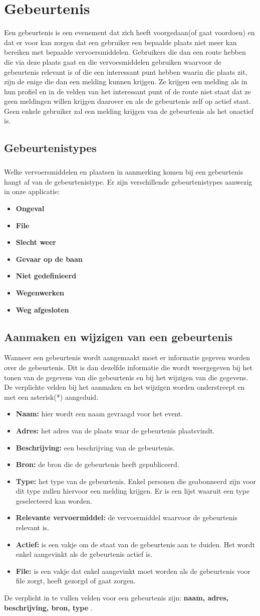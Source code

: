 \documentclass{scrbook}
\newcommand*{\veld}[1]{
	\item \textbf{#1} 
}
\newcommand*{\verplicht}[1]{
	\textbf{#1}
}
\begin{document}
\chapter{Gebeurtenis}
Een gebeurtenis is een evenement dat zich heeft voorgedaan(of gaat voordoen) en dat er voor kan zorgen dat een gebruiker een bepaalde plaats niet meer kan bereiken met bepaalde vervoersmiddelen. Gebruikers die dan een route hebben die via deze plaats gaat en die vervoesmiddelen gebruiken waarvoor de gebeurtenis relevant is of die een interessant punt hebben waarin die plaats zit, zijn de enige die dan een melding kunnen krijgen. Ze krijgen een melding als in hun profiel en in de velden van het interessant punt of de route niet staat dat ze geen meldingen willen krijgen daarover en als de gebeurtenis zelf op actief staat. Geen enkele gebruiker zal een melding krijgen van de gebeurtenis als het onactief is.

\section{Gebeurtenistypes}
\paragraph{}Welke vervoersmiddelen en plaatsen in aanmerking komen bij een gebeurtenis hangt af van de gebeurtenistype. Er zijn verschillende gebeurtenistypes aanwezig in onze applicatie:
\begin{itemize}
\veld{Ongeval}
\veld{File} 
\veld{Slecht weer}
\veld{Gevaar op de baan}
\veld{Niet gedefinieerd}
\veld{Wegenwerken}
\veld{Weg afgesloten}
\end{itemize}


\section{Aanmaken en wijzigen van een gebeurtenis}
Wanneer een gebeurtenis wordt aangemaakt moet er informatie gegeven worden over de gebeurtenis. Dit is dan dezelfde informatie die wordt weergegeven bij het tonen van de gegevens van die gebeurtenis en bij het wijzigen van die gegevens.\\ 
De verplichte velden bij het aanmaken en het wijzigen worden onderstreept en met een asterisk(*) aangeduid.

\begin{itemize}
\veld{Naam:} hier wordt een naam gevraagd voor het event.
\veld{Adres:} het adres van de plaats waar de gebeurtenis plaatsvindt.
\veld{Beschrijving:} een beschrijving van de gebeurtenis.
\veld{Bron:} de bron die de gebeurtenis heeft gepubliceerd.
\veld{Type:} het type van de gebeurtenis. Enkel personen die geabonneerd zijn voor dit type zullen hiervoor een melding krijgen. Er is een lijst waaruit een type geselecteerd kan worden.
\veld{Relevante vervoermiddel:} de vervoermiddel waarvoor de gebeurtenis relevant is.
\veld{Actief:} is een vakje om de staat van de gebeurtenis aan te duiden. Het wordt enkel aangevinkt als de gebeurtenis actief is.
\veld{File:} is een vakje dat enkel aangevinkt moet worden als de gebeurtenis voor file zorgt, heeft gezorgd of gaat zorgen. 
\end{itemize}

De verplicht in te vullen velden voor een gebeurtenis zijn: \verplicht{naam, adres, beschrijving, bron, type}.
\end{document}
